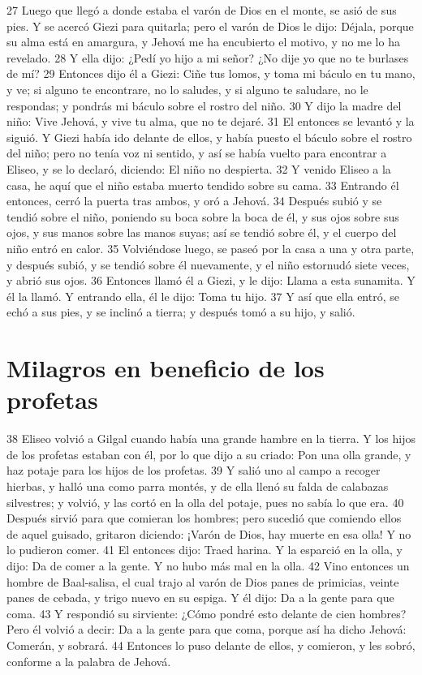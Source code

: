 27 Luego que llegó a donde estaba el varón de Dios en el monte, se asió de sus pies. Y se acercó Giezi para quitarla; pero el varón de Dios le dijo: Déjala, porque su alma está en amargura, y Jehová me ha encubierto el motivo, y no me lo ha revelado.
28 Y ella dijo: ¿Pedí yo hijo a mi señor? ¿No dije yo que no te burlases de mí?
29 Entonces dijo él a Giezi: Ciñe tus lomos, y toma mi báculo en tu mano, y ve; si alguno te encontrare, no lo saludes, y si alguno te saludare, no le respondas; y pondrás mi báculo sobre el rostro del niño.
30 Y dijo la madre del niño: Vive Jehová, y vive tu alma, que no te dejaré.
31 El entonces se levantó y la siguió. Y Giezi había ido delante de ellos, y había puesto el báculo sobre el rostro del niño; pero no tenía voz ni sentido, y así se había vuelto para encontrar a Eliseo, y se lo declaró, diciendo: El niño no despierta.
32 Y venido Eliseo a la casa, he aquí que el niño estaba muerto tendido sobre su cama.
33 Entrando él entonces, cerró la puerta tras ambos, y oró a Jehová.
34 Después subió y se tendió sobre el niño, poniendo su boca sobre la boca de él, y sus ojos sobre sus ojos, y sus manos sobre las manos suyas; así se tendió sobre él, y el cuerpo del niño entró en calor.
35 Volviéndose luego, se paseó por la casa a una y otra parte, y después subió, y se tendió sobre él nuevamente, y el niño estornudó siete veces, y abrió sus ojos.
36 Entonces llamó él a Giezi, y le dijo: Llama a esta sunamita. Y él la llamó. Y entrando ella, él le dijo: Toma tu hijo.
37 Y así que ella entró, se echó a sus pies, y se inclinó a tierra; y después tomó a su hijo, y salió.

\section*{Milagros en beneficio de los profetas}

38 Eliseo volvió a Gilgal cuando había una grande hambre en la tierra. Y los hijos de los profetas estaban con él, por lo que dijo a su criado: Pon una olla grande, y haz potaje para los hijos de los profetas.
39 Y salió uno al campo a recoger hierbas, y halló una como parra montés, y de ella llenó su falda de calabazas silvestres; y volvió, y las cortó en la olla del potaje, pues no sabía lo que era.
40 Después sirvió para que comieran los hombres; pero sucedió que comiendo ellos de aquel guisado, gritaron diciendo: ¡Varón de Dios, hay muerte en esa olla! Y no lo pudieron comer.
41 El entonces dijo: Traed harina. Y la esparció en la olla, y dijo: Da de comer a la gente. Y no hubo más mal en la olla.
42 Vino entonces un hombre de Baal-salisa, el cual trajo al varón de Dios panes de primicias, veinte panes de cebada, y trigo nuevo en su espiga. Y él dijo: Da a la gente para que coma.
43 Y respondió su sirviente: ¿Cómo pondré esto delante de cien hombres? Pero él volvió a decir: Da a la gente para que coma, porque así ha dicho Jehová: Comerán, y sobrará.
44 Entonces lo puso delante de ellos, y comieron, y les sobró, conforme a la palabra de Jehová.

